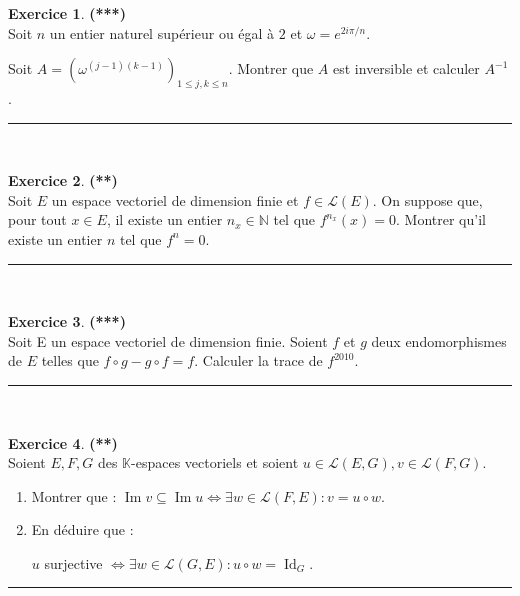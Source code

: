 \documentclass[a4paper,11pt]{article}
\theoremstyle{definition}
\newtheorem{exo}{Exercice} %
\begin{document}
\begin{exo}\textbf{(***)}\quad\\[0.25cm]%
Soit $n$ un entier naturel supérieur ou égal à $2$ et $\omega=e^{2i\pi/n}$.

Soit $A =(\omega^{(j-1)(k-1)})_{1\leqslant j,k\leqslant n}$. Montrer que $A$ est inversible et calculer $A^{-1}$.\quad\\[0.2cm]

	\centering
\rule{1\linewidth}{0.6pt}\quad\\[0.2cm]
\end{exo}

\begin{exo}\textbf{(**)}\quad\\[0.25cm]
	Soit $E$ un espace vectoriel de dimension finie et $f\in\mathcal L(E)$.
	On suppose que, pour tout $x\in E$, il existe un entier $n_x\in\mathbb N$ tel
	que $f^{n_x}(x)=0.$ Montrer qu'il existe un entier $n$ tel que $f^n=0$.\quad\\[0.2cm]
	
	\centering
	\rule{1\linewidth}{0.6pt}\quad\\[0.2cm]
\end{exo}

\begin{exo}\textbf{(***)}\quad\\[0.25cm]%
	Soit E un espace vectoriel de dimension finie. 
	Soient $f$ et $g$ deux endomorphismes de $E$ telles que $f\circ g-g\circ f=f$. Calculer la trace de $f^{2010}$.\quad\\[0.2cm]
	
	\centering
	\rule{1\linewidth}{0.6pt}\quad\\[0.2cm]
\end{exo}
\newpage

\begin{exo}\textbf{(**)}\quad\\[0.25cm]
	Soient $E, F, G$ des $\mathbb{K}$-espaces vectoriels et soient $u \in \mathcal{L}(E, G), v \in \mathcal{L}(F, G)$.
	
	\begin{enumerate}
		\item Montrer que : $\operatorname{Im} v \subseteq \operatorname{Im} u \Leftrightarrow \exists w \in \mathcal{L}(F, E): v=u \circ w$.
		\item En déduire que :
		
		$u$ surjective $\Leftrightarrow \exists w \in \mathcal{L}(G, E): u \circ w=\operatorname{Id}_{G}$.
	\end{enumerate}
	
	\centering
	\rule{1\linewidth}{0.6pt}
\end{exo}
\end{document}
